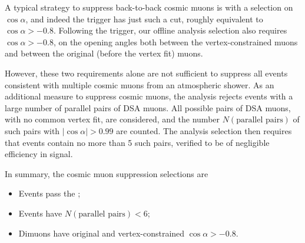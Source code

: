 A typical strategy to suppress back-to-back cosmic muons is with a selection on $\cos{\alpha}$, and indeed the trigger has just such a cut, roughly equivalent to $\cos{\alpha} > -0.8$.
Following the trigger, our offline analysis selection also requires $\cos{\alpha} > -0.8$, on the opening angles both between the vertex-constrained muons and between the original (before the vertex fit) muons.

However, these two requirements alone are not sufficient to suppress all events consistent with multiple cosmic muons from an atmospheric shower.
As an additional measure to suppress cosmic muons, the analysis rejects events with a large number of parallel pairs of DSA muons.
All possible pairs of DSA muons, with no common vertex fit, are considered, and the number $N(\text{parallel pairs})$ of such pairs with $|\cos{\alpha}| > 0.99$ are counted.
The analysis selection then requires that events contain no more than 5 such pairs, verified to be of negligible efficiency in signal.

In summary, the cosmic muon suppression selections are
\begin{itemize}
  \item Events pass the ;
  \item Events have $N(\text{parallel pairs}) < 6$;
  \item Dimuons have original and vertex-constrained $\cos{\alpha} > -0.8$.
\end{itemize}

